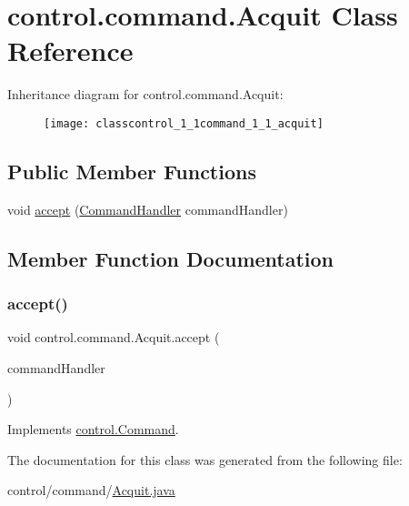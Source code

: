 \hypertarget{classcontrol_1_1command_1_1_acquit}{}\section{control.\+command.\+Acquit Class Reference}
\label{classcontrol_1_1command_1_1_acquit}
Inheritance diagram for control.\+command.\+Acquit\+:\begin{figure}[H]
\begin{center}
\leavevmode
\texttt{[image: classcontrol\_1\_1command\_1\_1\_acquit]}
\end{center}
\end{figure}
\subsection*{Public Member Functions}
\begin{DoxyCompactItemize}
\item 
void \mbox{\hyperlink{classcontrol_1_1command_1_1_acquit_a9b0f50417f8148f36c8afed609bdd78b}{accept}} (\mbox{\hyperlink{interfacecontrol_1_1_command_handler}{Command\+Handler}} command\+Handler)
\end{DoxyCompactItemize}


\subsection{Member Function Documentation}
\mbox{\label{classcontrol_1_1command_1_1_acquit_a9b0f50417f8148f36c8afed609bdd78b}} 
\subsubsection{\texorpdfstring{accept()}{accept()}}
{\footnotesize\ttfamily void control.\+command.\+Acquit.\+accept (\begin{DoxyParamCaption}\item[{\mbox{\hyperlink{interfacecontrol_1_1_command_handler}{Command\+Handler}}}]{command\+Handler }\end{DoxyParamCaption})}



Implements \mbox{\hyperlink{interfacecontrol_1_1_command_ab81fb31e9d98dfbfbfb7026a5bc823a6}{control.\+Command}}.



The documentation for this class was generated from the following file\+:\begin{DoxyCompactItemize}
\item 
control/command/\mbox{\hyperlink{_acquit_8java}{Acquit.\+java}}\end{DoxyCompactItemize}
